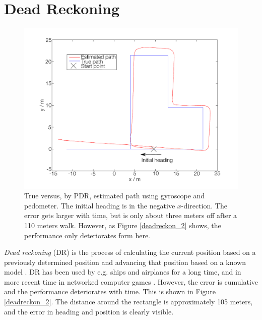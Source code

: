 \documentclass{LTHthesis}
\begin{document}
\section{Dead Reckoning}
%
\begin{figure}[!hbt]

\includegraphics[width=1\textwidth ]{images/kinematic/deadreckon_1}
\caption{True versus, by PDR, estimated path using gyroscope and pedometer. The initial heading is in the negative $x$-direction. The error gets larger with time, but is only about three meters off after a 110 meters walk. However, as Figure \ref{deadreckon_2} shows, the performance only deteriorates form here.}\label{deadreckon_1}
\end{figure}
%
\emph{Dead reckoning} (DR) is the process of calculating the current position based on a previously determined position and advancing that position based on a known model \cite{ped_dead}. DR has been used by e.g. ships and airplanes for a long time, and in more recent time in networked computer games \cite{network_game}. However, the error is cumulative and the performance deteriorates with time. This is shown in Figure \ref{deadreckon_2}. The distance around the rectangle is approximately 105 meters, and the error in heading and position is clearly visible. 
\end{document}

